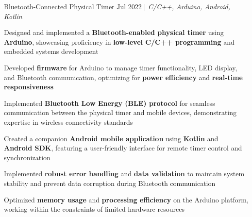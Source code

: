 \resumeSubheadings
{Bluetooth-Connected Physical Timer }{Jul 2022}
{}{}{| \textit{C/C++, Arduino, Android, Kotlin}}
\resumeItemListStart
\item Designed and implemented a \textbf{Bluetooth-enabled physical timer} using \textbf{Arduino}, showcasing proficiency in \textbf{low-level C/C++ programming} and embedded systems development
\item Developed \textbf{firmware} for Arduino to manage timer functionality, LED display, and Bluetooth communication, optimizing for \textbf{power efficiency} and \textbf{real-time responsiveness}
\item Implemented \textbf{Bluetooth Low Energy (BLE) protocol} for seamless communication between the physical timer and mobile devices, demonstrating expertise in wireless connectivity standards
\item Created a companion \textbf{Android mobile application} using \textbf{Kotlin} and \textbf{Android SDK}, featuring a user-friendly interface for remote timer control and synchronization
\item Implemented \textbf{robust error handling} and \textbf{data validation} to maintain system stability and prevent data corruption during Bluetooth communication
\item Optimized \textbf{memory usage} and \textbf{processing efficiency} on the Arduino platform, working within the constraints of limited hardware resources
\resumeItemListEnd